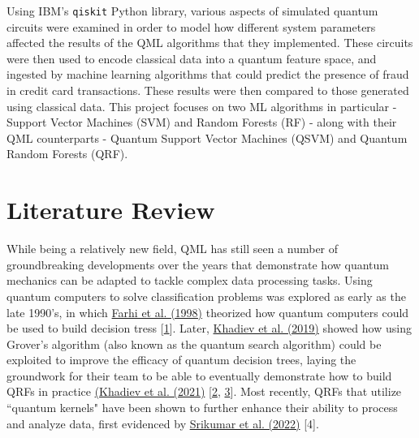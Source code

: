 \documentclass[11pt, oneside]{article}   	%
\begin{document}
\noindent\hspace{10mm}Using IBM’s \texttt{qiskit} Python library, various aspects of simulated quantum circuits were examined in order to model how different system parameters affected the results of the QML algorithms that they implemented. These circuits were then used to encode classical data into a quantum feature space, and ingested by machine learning algorithms that could predict the presence of fraud in credit card transactions. These results were then compared to those generated using classical data. This project focuses on two ML algorithms in particular - Support Vector Machines (SVM) and Random Forests (RF) - along with their QML counterparts - Quantum Support Vector Machines (QSVM) and Quantum Random Forests (QRF). 




\section{Literature Review}

\noindent\hspace{10mm}While being a relatively new field, QML has still seen a number of groundbreaking developments over the years that demonstrate how quantum mechanics can be adapted to tackle complex data processing tasks. Using quantum computers to solve classification problems was explored as early as the late 1990's, in which \href{https://journals.aps.org/pra/abstract/10.1103/PhysRevA.58.915}{Farhi et al. (1998)} theorized how quantum computers could be used to build decision tress [\href{https://journals.aps.org/pra/abstract/10.1103/PhysRevA.58.915}{1}]. Later, \href{https://arxiv.org/abs/1907.06840}{Khadiev et al. (2019)} showed how using Grover's algorithm (also known as the quantum search algorithm) could be exploited to improve the efficacy of quantum decision trees, laying the groundwork for their team to be able to eventually demonstrate how to build QRFs in practice \href{https://arxiv.org/abs/2112.13346}{(Khadiev et al. (2021)} [\href{https://arxiv.org/abs/1907.06840}{2}, \href{https://arxiv.org/abs/2112.13346}{3}]. Most recently, QRFs that utilize ``quantum kernels" have been shown to further enhance their ability to process and analyze data, first evidenced by \href{https://arxiv.org/abs/2210.02355}{Srikumar et al. (2022)} [4]. \\
\end{document}

